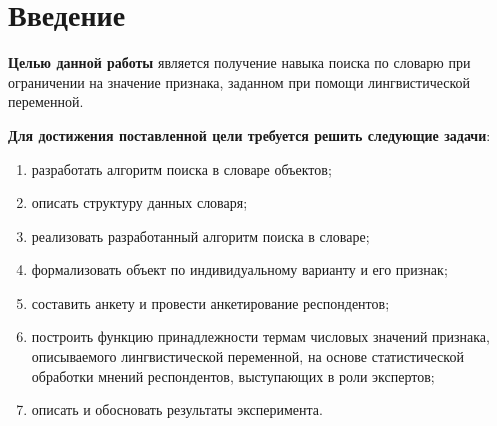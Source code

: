 \chapter*{Введение}
\textbf{Целью данной работы} является получение навыка поиска по словарю при ограничении на значение признака, заданном при помощи лингвистической переменной.

\textbf{Для достижения поставленной цели требуется решить следующие задачи}:
\begin{enumerate}[label={\arabic*)}]
        \item разработать алгоритм поиска в словаре объектов;
	\item описать структуру данных словаря;
        \item реализовать разработанный алгоритм поиска в словаре;
          \item формализовать объект по индивидуальному варианту и его признак;
        \item составить анкету и провести анкетирование респондентов;
	\item построить функцию принадлежности термам числовых значений признака, описываемого лингвистической переменной, на основе статистической обработки мнений респондентов, выступающих в роли экспертов;
        \item описать и обосновать результаты эксперимента.
\end{enumerate}